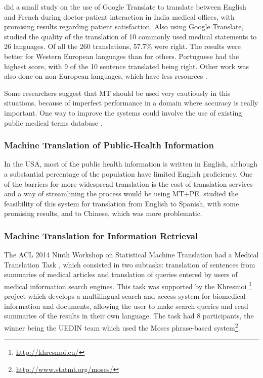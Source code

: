 \citep{Kaliyadan2010} did a small study on the use of Google Translate to translate between English and French during doctor-patient interaction in India medical offices, with promising results regarding patient satisfaction. Also using Google Translate, \citep{Patil2014} studied the quality of the translation of 10 commonly used medical statements to 26 languages. Of all the 260 translations, 57.7\% were right. The results were better for Western European languages than for others. Portuguese had the highest score, with 9 of the 10 sentence translated being right. Other work was also done on non-European languages, which have less resources \citep{Musleh2016, Kathol2005}.

Some researchers \citep{G2013, Conference2012, Kaliyadan2010} suggest that MT should be used very cautiously in this situations, because of imperfect performance in a domain where accuracy is really important. One way to improve the systems could involve the use of existing public medical terms database \citep{Eck2004}.

\subsubsection{Machine Translation of Public-Health Information}

In the USA, most of the public health information is written in English, although a substantial percentage of the population have limited English proficiency. One of the barriers for more widespread translation is the cost of translation services and a way of streamlining the process would be using MT+PE. \citep{Kirchhoff2011, Turner2015} studied the feasibility of this system for translation from English to Spanish, with some promising results, and to Chinese, which was more problematic.

\subsubsection{Machine Translation for Information Retrieval}

The ACL 2014 Ninth Workshop on Statistical Machine Translation had a Medical Translation Task \citep{Bojar2014}, which consisted in two subtasks: translation of sentences from summaries of medical articles and translation of queries entered by users of medical information search engines. This task was supported by the Khresmoi \footnote{\url{http://khresmoi.eu/}} project which develops a multilingual search and access system for biomedical information and documents, allowing the user to make search queries and read summaries of the results in their own language. The task had 8 participants, the winner being the UEDIN team \citep{Durrani2014} which used the Moses phrase-based system\footnote{\url{http://www.statmt.org/moses/}}.


